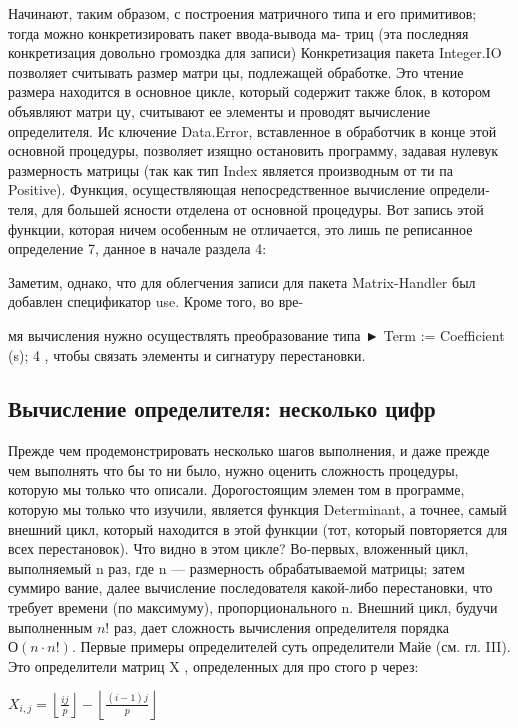 Начинают, таким образом, с построения матричного типа и его
примитивов; тогда можно конкретизировать пакет ввода-вывода ма-
\newpage
триц (эта последняя конкретизация довольно громоздка для записи)
Конкретизация пакета Integer.IO позволяет считывать размер матри­
цы, подлежащей обработке. Это чтение размера находится в основное
цикле, который содержит также блок, в котором объявляют матри­
цу, считывают ее элементы и проводят вычисление определителя. Ис­
ключение Data.Error, вставленное в обработчик в конце этой основной
процедуры, позволяет изящно остановить программу, задавая нулевук
размерность матрицы (так как тип Index является производным от ти­
па Positive).
Функция, осуществляющая непосредственное вычисление определи­
теля, для большей ясности отделена от основной процедуры. Вот запись
этой функции, которая ничем особенным не отличается, это лишь пе­
реписанное определение 7, данное в начале раздела 4:


Заметим, однако, что для облегчения записи для пакета
Matrix-Handler был добавлен спецификатор use. Кроме того, во вре-
\newpage

мя вычисления нужно осуществлять преобразование типа ► Term :=
Coefficient (s); 4 , чтобы связать элементы и сигнатуру перестановки.

\subsection{Вычисление определителя: несколько цифр}

Прежде чем продемонстрировать несколько шагов выполнения, и даже
прежде чем выполнять что бы то ни было, нужно оценить сложность
процедуры, которую мы только что описали. Дорогостоящим элемен­
том в программе, которую мы только что изучили, является функция
Determinant, а точнее, самый внешний цикл, который находится в этой
функции (тот, который повторяется для всех перестановок).
Что видно в этом цикле? Во-первых, вложенный цикл, выполняемый
n раз, где n — размерность обрабатываемой матрицы; затем суммиро­
вание, далее вычисление последователя какой-либо перестановки, что
требует времени (по максимуму), пропорционального n. Внешний цикл,
будучи выполненным $n!$ раз, дает сложность вычисления определителя
порядка $О(n \cdot n!)$. Первые примеры определителей суть определители
Майе (см. гл. III). Это определители матриц X , определенных для про­
стого р через:

\begin{center}
\( X_{i,j} = \left\lfloor \frac{ij}{p} \right\rfloor - \left\lfloor \frac{(i-1)j}{p} \right\rfloor \)
\end{center}

